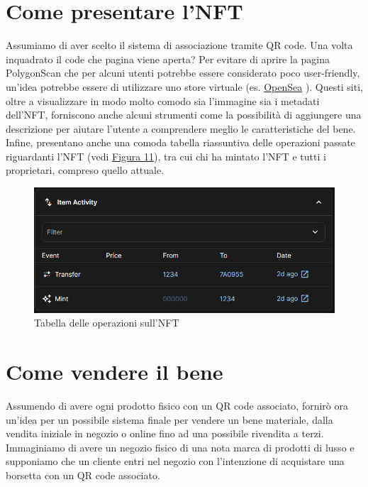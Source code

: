 \documentclass[12pt]{report}
\begin{document}
\section{Come presentare l'NFT}
\label{sec:presentare}
Assumiamo di aver scelto il sistema di associazione tramite QR code. Una volta inquadrato il code che pagina viene aperta?\newline
Per evitare di aprire la pagina PolygonScan che per alcuni utenti potrebbe essere considerato poco user-friendly, un'idea potrebbe essere di utilizzare uno store virtuale (es. \href{https://opensea.io/}{OpenSea} \cite{Ventidue}).\newline
Questi siti, oltre a visualizzare in modo molto comodo sia l'immagine sia i metadati dell'NFT, forniscono anche alcuni strumenti come la possibilità di aggiungere una descrizione per aiutare l'utente a comprendere meglio le caratteristiche del bene.\newline
Infine, presentano anche una comoda tabella riassuntiva delle operazioni passate riguardanti l'NFT (vedi \hyperref[fig:OpenSea]{Figura 11}), tra cui chi ha mintato l'NFT e tutti i proprietari, compreso quello attuale.
\begin{figure}[H]
    \centering
    \includegraphics[width=1.1\textwidth]{OpenSea.PNG}
    \captionsetup{justification=centering}
    \caption{Tabella delle operazioni sull'NFT \cite{Ventidue}}
    \label{fig:OpenSea}
\end{figure}\newpage

\section{Come vendere il bene}
\label{sec:vendere}
Assumendo di avere ogni prodotto fisico con un QR code associato, fornirò ora un'idea per un possibile sistema finale per vendere un bene materiale, dalla vendita iniziale in negozio o online fino ad una possibile rivendita a terzi.\newline
Immaginiamo di avere un negozio fisico di una nota marca di prodotti di lusso e supponiamo che un cliente entri nel negozio con l'intenzione di acquistare una borsetta con un QR code associato.
\end{document}
